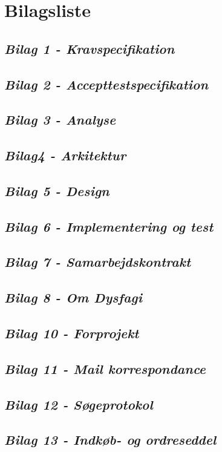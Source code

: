 \chapter{Bilagsliste}
\section{\textit{Bilag 1 - Kravspecifikation}} \label{bilag1}
\section{\textit{Bilag 2 - Accepttestspecifikation}} \label{bilag2}
\section{\textit{Bilag 3 - Analyse}} \label{bilag3}
\section{\textit{Bilag4 - Arkitektur}} \label{bilag4}
\section{\textit{Bilag 5 - Design}} \label{bilag5}
\section{\textit{Bilag 6 - Implementering og test}} \label{bilag6}
\section{\textit{Bilag 7 - Samarbejdskontrakt}} \label{bilag7}
\section{\textit{Bilag 8 - Om Dysfagi}} \label{bilag8}
\section{\textit{Bilag 10 - Forprojekt}} \label{bilag10}
\section{\textit{Bilag 11 - Mail korrespondance}} \label{bilag11}
\section{\textit{Bilag 12 - Søgeprotokol}} \label{bilag12}
\section{\textit{Bilag 13 - Indkøb- og ordreseddel}} \label{bilag13}



